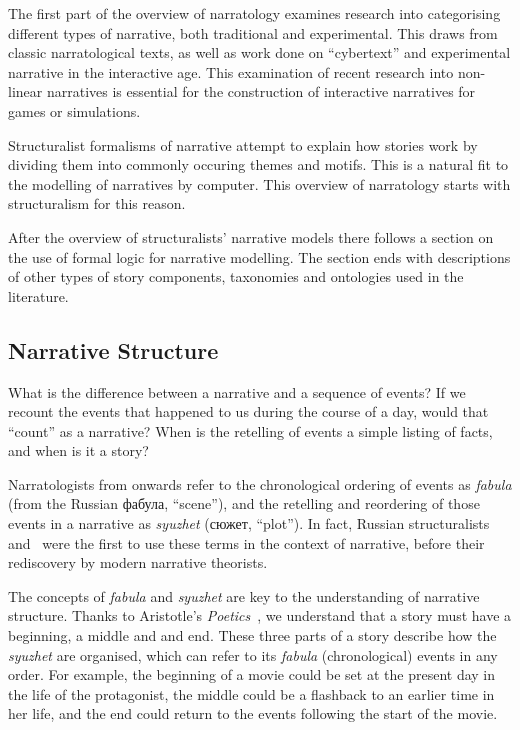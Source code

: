 \documentclass[11pt]{report}
\begin{document}
The first part of the overview of narratology examines research into categorising different types of narrative, both traditional and experimental.
This draws from classic narratological texts, as well as work done on
``cybertext'' and experimental narrative in the interactive age. This
examination of recent research into non-linear narratives is essential for the
construction of interactive narratives for games or simulations.

Structuralist formalisms of narrative attempt to explain how stories work by dividing them into commonly occuring themes and motifs. This is a natural fit to the modelling of narratives by computer. This overview of narratology starts with structuralism for this reason.

After the overview of structuralists' narrative models there follows a section on the use of formal logic for narrative modelling. The section ends with descriptions of other types of story components, taxonomies and ontologies used in the literature.

\subsection{Narrative Structure}
\label{sec:structure}
What is the difference between a narrative and a sequence of events? If we
recount the events that happened to us during the course of a day, would that
``count'' as a narrative? When is the retelling of events a simple listing of
facts, and when is it a story?

Narratologists from \citet{bal2009narratology} onwards refer to the
chronological ordering of events as \emph{fabula} (from the Russian фабула, ``scene''), and the retelling and
reordering of those events in a narrative as \emph{syuzhet} (сюжет, ``plot'').
In fact, Russian structuralists~\citet{propp1968morphology} and~\citet{shklovsky1991theory} were the first to use these terms in the
context of narrative, before their rediscovery by modern narrative theorists.

The concepts of \emph{fabula} and \emph{syuzhet} are key to the understanding of
narrative structure. Thanks to Aristotle's
\emph{Poetics}~\citep{halliwell1986aristotle}, we understand that a story must
have a beginning, a middle and and end. These three parts of a story describe
how the \emph{syuzhet} are organised, which can refer to its \emph{fabula}
(chronological) events in any order. For example, the beginning of a movie could
be set at the present day in the life of the protagonist, the middle could be a
flashback to an earlier time in her life, and the end could return to the events
following the start of the movie.
\end{document}

